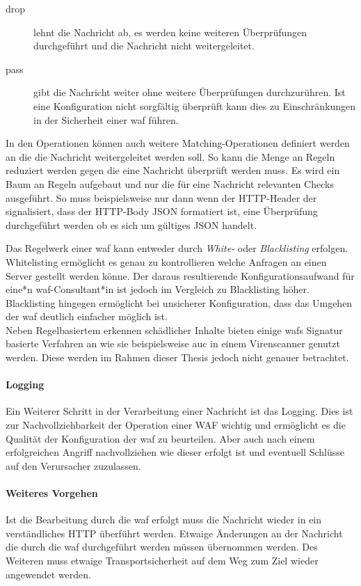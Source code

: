 \begin{description}
    \item[drop] lehnt die Nachricht ab, es werden keine weiteren Überprüfungen durchgeführt und die Nachricht nicht weitergeleitet.
    \item[pass] gibt die Nachricht weiter ohne weitere Überprüfungen durchzurühren.
    Ist eine Konfiguration nicht sorgfältig überprüft kann dies zu Einschränkungen in der Sicherheit einer \ac{waf} führen.
\end{description}

In den Operationen können auch weitere Matching-Operationen definiert werden an die die Nachricht weitergeleitet werden soll.
So kann die Menge an Regeln reduziert werden gegen die eine Nachricht überprüft werden muss.
Es wird ein Baum an Regeln aufgebaut und nur die für eine Nachricht relevanten Checks ausgeführt.
So muss beispielsweise nur dann wenn der HTTP-Header der signalisiert, dass der HTTP-Body JSON formatiert ist, eine Überprüfung durchgeführt werden ob es sich um gültiges JSON handelt.

Das Regelwerk einer \ac{waf} kann entweder durch \textit{White-} oder \textit{Blacklisting} erfolgen.
Whitelisting ermöglicht es genau zu kontrollieren welche Anfragen an einen Server gestellt werden könne.
Der daraus resultierende Konfigurationsaufwand für eine*n \ac{waf}-Consultant*in ist jedoch im Vergleich zu Blacklisting höher.
Blacklisting hingegen ermöglicht bei unsicherer Konfiguration, dass das Umgehen der \ac{waf} deutlich einfacher möglich ist.\\

Neben Regelbasiertem erkennen schädlicher Inhalte bieten einige \acp{waf} Signatur basierte Verfahren an wie sie beispielsweise auc in einem Virenscanner genutzt werden.
Diese werden im Rahmen dieser Thesis jedoch nicht genauer betrachtet.

\paragraph{Logging}
Ein Weiterer Schritt in der Verarbeitung einer Nachricht ist das Logging.
Dies ist zur Nachvollziehbarkeit der Operation einer WAF wichtig und ermöglicht es die Qualität der Konfiguration der \ac{waf} zu beurteilen.
Aber auch nach einem erfolgreichen Angriff nachvollziehen wie dieser erfolgt ist und eventuell Schlüsse auf den Verursacher zuzulassen.

\paragraph{Weiteres Vorgehen}
Ist die Bearbeitung durch die \ac{waf} erfolgt muss die Nachricht wieder in ein verständliches HTTP überführt werden.
Etwaige Änderungen an der Nachricht die durch die \ac{waf} durchgeführt werden müssen übernommen werden.
Des Weiteren muss etwaige Transportsicherheit auf dem Weg zum Ziel wieder angewendet werden.\\

